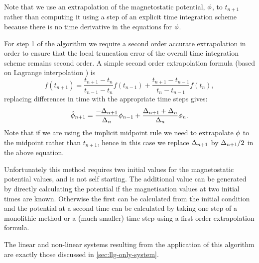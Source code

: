 Note that we use an extrapolation of the magnetostatic potential, $\phi$, to $t_{n+1}$ rather than computing it using a step of an explicit time integration scheme because there is no time derivative in the equations for $\phi$.


For step 1 of the algorithm we require a second order accurate extrapolation in order to ensure that the local truncation error of the overall time integration scheme remains second order.
A simple second order extrapolation formula (based on Lagrange interpolation \cite[312]{Kincaid2002}) is
\begin{equation}
  \label{eq:65}
  f(t_{n+1}) = \frac{t_{n+1} - t_n}{t_{n-1} - t_n}f(t_{n-1}) + \frac{t_{n+1} - t_{n-1}}{t_n - t_{n-1}}f(t_n),
\end{equation}
replacing differences in time with the appropriate time steps gives:
\begin{equation}
  \label{eq:66}
  \hat{\phi}_{n+1} = \frac{-\Delta_{n+1}}{\Delta_{n}} \phi_{n-1} + \frac{\Delta_{n+1} + \Delta_{n}}{\Delta_{n}} \phi_n.
\end{equation}
Note that if we are using the implicit midpoint rule we need to extrapolate $\phi$ to the midpoint rather than $t_{n+1}$, hence in this case we replace $\Delta_{n+1}$ by $\Delta_{n+1} /2$ in the above equation.


Unfortunately this method requires two initial values for the magnetostatic potential values, and is not self starting.
The additional value can be generated by directly calculating the potential if the magnetisation values at two initial times are known.
Otherwise the first can be calculated from the initial condition and the potential at a second time can be calculated by taking one step of a monolithic method or a (much smaller) time step using a first order extrapolation formula.

The linear and non-linear systems resulting from the application of this algorithm are exactly those discussed in \cref{sec:llg-only-system}.




